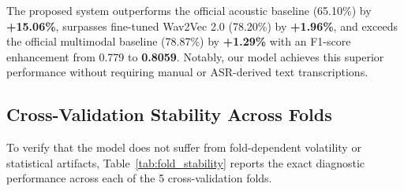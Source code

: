 \documentclass[conference]{IEEEtran}
\begin{document}
\begin{table}[htbp]
\caption{Benchmark Comparison Against Published ADReSSo Studies}
\label{tab:benchmark_comparison}
\centering
{}
\end{table}

The proposed system outperforms the official acoustic baseline (65.10\%) by \textbf{+15.06\%}, surpasses fine-tuned Wav2Vec 2.0 (78.20\%) by \textbf{+1.96\%}, and exceeds the official multimodal baseline (78.87\%) by \textbf{+1.29\%} with an F1-score enhancement from 0.779 to \textbf{0.8059}. Notably, our model achieves this superior performance without requiring manual or ASR-derived text transcriptions.

\subsection{Cross-Validation Stability Across Folds}
To verify that the model does not suffer from fold-dependent volatility or statistical artifacts, Table~\ref{tab:fold_stability} reports the exact diagnostic performance across each of the 5 cross-validation folds.

\begin{table}[htbp]
\caption{5-Fold Stratified Cross-Validation Stability Breakdown}
\label{tab:fold_stability}
\centering
{}
\end{table}
\end{document}
